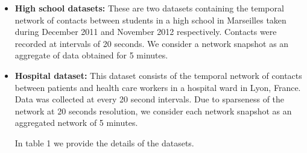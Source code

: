 \begin{itemize}
\item {\bf High school datasets:}
These are two datasets containing the temporal network of contacts between students in a high school in Marseilles taken during December 2011 and November 2012 respectively. 
Contacts were recorded at intervals of 20 seconds. We consider a network snapshot as an aggregate of data obtained for 5 minutes. 

\item {\bf Hospital dataset:}
This dataset consists of the temporal network of contacts between patients and health care workers in a hospital ward in Lyon, France. Data was collected at every 20 second intervals.
 Due to sparseness of the network at 20 seconds resolution, we consider each network snapshot as an aggregated network of 5 minutes. 
 
 
 In table 1 we provide the details of the datasets.  
%  
 \end{itemize}
 

